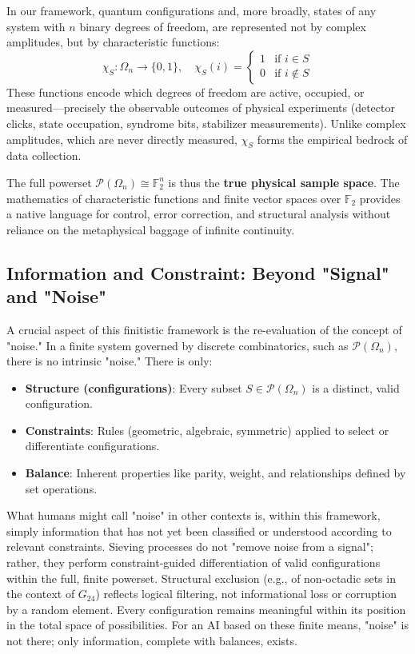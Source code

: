 \documentclass[11pt,a4paper]{article}
\begin{document}
In our framework, quantum configurations and, more broadly, states of any system with $n$ binary degrees of freedom, are represented not by complex amplitudes, but by characteristic functions:
\[ \chi_S : \Omega_n \to \{0,1\}, \quad \chi_S(i) = \begin{cases} 1 & \text{if } i \in S \\ 0 & \text{if } i \notin S \end{cases} \]
These functions encode which degrees of freedom are active, occupied, or measured—precisely the observable outcomes of physical experiments (detector clicks, state occupation, syndrome bits, stabilizer measurements). Unlike complex amplitudes, which are never directly measured, $\chi_S$ forms the empirical bedrock of data collection.

The full powerset $\mathcal{P}(\Omega_n) \cong \mathbb{F}_2^n$ is thus the \textbf{true physical sample space}. The mathematics of characteristic functions and finite vector spaces over $\mathbb{F}_2$ provides a native language for control, error correction, and structural analysis without reliance on the metaphysical baggage of infinite continuity.

\subsection{Information and Constraint: Beyond "Signal" and "Noise"}

A crucial aspect of this finitistic framework is the re-evaluation of the concept of "noise." In a finite system governed by discrete combinatorics, such as $\mathcal{P}(\Omega_n)$, there is no intrinsic "noise." There is only:

\begin{itemize}
    \item \textbf{Structure (configurations)}: Every subset $S \in \mathcal{P}(\Omega_n)$ is a distinct, valid configuration.
    \item \textbf{Constraints}: Rules (geometric, algebraic, symmetric) applied to select or differentiate configurations.
    \item \textbf{Balance}: Inherent properties like parity, weight, and relationships defined by set operations.
\end{itemize}

What humans might call "noise" in other contexts is, within this framework, simply information that has not yet been classified or understood according to relevant constraints. Sieving processes do not "remove noise from a signal"; rather, they perform constraint-guided differentiation of valid configurations within the full, finite powerset. Structural exclusion (e.g., of non-octadic sets in the context of $G_{24}$) reflects logical filtering, not informational loss or corruption by a random element. Every configuration remains meaningful within its position in the total space of possibilities. For an AI based on these finite means, "noise" is not there; only information, complete with balances, exists.
\end{document}
